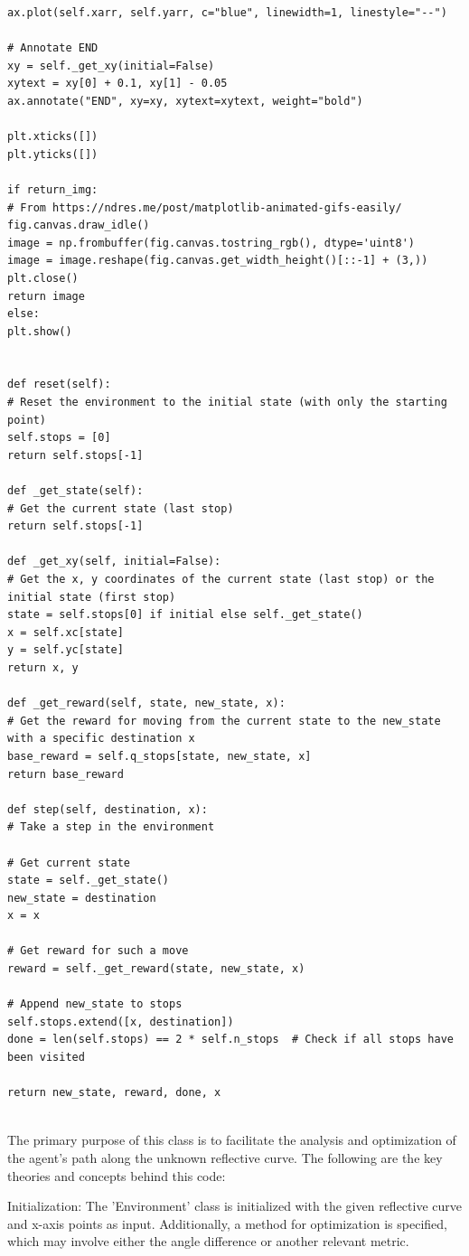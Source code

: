 \documentclass[12pt,a4paper,twoside]{report}
\begin{document}
\begin{lstlisting}
ax.plot(self.xarr, self.yarr, c="blue", linewidth=1, linestyle="--")

# Annotate END
xy = self._get_xy(initial=False)
xytext = xy[0] + 0.1, xy[1] - 0.05
ax.annotate("END", xy=xy, xytext=xytext, weight="bold")

plt.xticks([])
plt.yticks([])

if return_img:
# From https://ndres.me/post/matplotlib-animated-gifs-easily/
fig.canvas.draw_idle()
image = np.frombuffer(fig.canvas.tostring_rgb(), dtype='uint8')
image = image.reshape(fig.canvas.get_width_height()[::-1] + (3,))
plt.close()
return image
else:
plt.show()


def reset(self):
# Reset the environment to the initial state (with only the starting point)
self.stops = [0]
return self.stops[-1]

def _get_state(self):
# Get the current state (last stop)
return self.stops[-1]

def _get_xy(self, initial=False):
# Get the x, y coordinates of the current state (last stop) or the initial state (first stop)
state = self.stops[0] if initial else self._get_state()
x = self.xc[state]
y = self.yc[state]
return x, y

def _get_reward(self, state, new_state, x):
# Get the reward for moving from the current state to the new_state with a specific destination x
base_reward = self.q_stops[state, new_state, x]
return base_reward

def step(self, destination, x):
# Take a step in the environment

# Get current state
state = self._get_state()
new_state = destination
x = x

# Get reward for such a move
reward = self._get_reward(state, new_state, x)

# Append new_state to stops
self.stops.extend([x, destination])
done = len(self.stops) == 2 * self.n_stops  # Check if all stops have been visited

return new_state, reward, done, x


\end{lstlisting}

The primary purpose of this class is to facilitate the analysis and optimization of the agent's path along the unknown reflective curve. The following are the key theories and concepts behind this code:

Initialization:
The 'Environment' class is initialized with the given reflective curve and x-axis points as input. Additionally, a method for optimization is specified, which may involve either the angle difference or another relevant metric.
\end{document}
